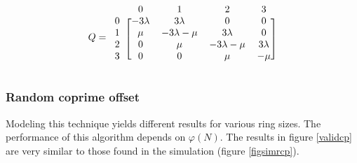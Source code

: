 \documentclass[10pt,a4paper]{article}
\begin{document}
\[ Q =
  \begin{blockarray}{ccccc}
    & 0 & 1 & 2 & 3 \\
    \begin{block}{c[cccc]}
    0 & -3\lambda & 3\lambda & 0 & 0 \\
    1 & \mu & -3\lambda-\mu & 3\lambda & 0 \\
    2 & 0 & \mu & -3\lambda-\mu & 3\lambda \\
    3 & 0 & 0 & \mu & -\mu \\
    \end{block}
  \end{blockarray}
\]

\subsubsection*{Random coprime offset}
Modeling this technique yields different results for various ring sizes. The performance of this algorithm depends on $\varphi(N)$. The results in figure \ref{validcp} are very similar to those found in the simulation (figure \ref{figsimrcp}).
\end{document}

